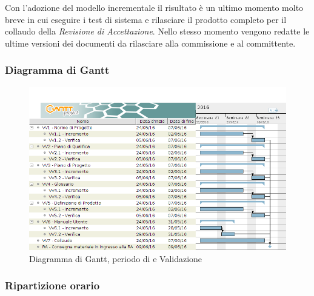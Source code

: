 Con l'adozione del modello incrementale il risultato \`e un ultimo momento molto breve in cui eseguire i test di sistema e rilasciare il prodotto completo per il collaudo della \textit{Revisione di Accettazione}. Nello stesso momento vengono redatte le ultime versioni dei documenti da rilasciare alla commissione e al committente.

\subsubsection{Diagramma di Gantt}
\begin{figure}[ht!]
  \includegraphics[width=1\textwidth]{res/img/pianificazione/VerificaEValidazione.png}
  \caption{Diagramma di Gantt, periodo di  e Validazione}
\end{figure}

\subsubsection{Ripartizione orario}

